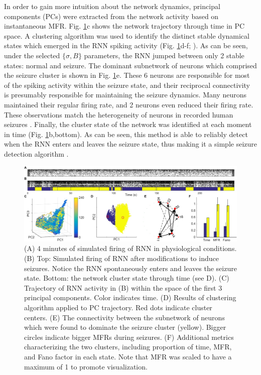 \documentclass[journal,twoside,web]{ieeecolor}
\begin{document}
In order to gain more intuition about the network dynamics, principal components (PCs) were extracted from the network activity based on instantaneous MFR.
Fig. \ref{seizure}c shows the network trajectory through time in PC space.
A clustering algorithm was used to identify the distinct stable dynamical states which emerged in the RNN spiking activity (Fig. \ref{seizure}d-f; \cite{sasaki07,santaniello14}).
As can be seen, under the selected $\{\sigma,B\}$ parameters, the RNN jumped between only 2 stable states: normal and seizure.
The dominant subnetwork of neurons which comprised the seizure cluster is shown in Fig. \ref{seizure}e.
These 6 neurons are responsible for most of the spiking activity within the seizure state, and their reciprocal connectivity is presumably responsible for maintaining the seizure dynamics.
Many neurons maintained their regular firing rate, and 2 neurons even reduced their firing rate.
These observations match the heterogeneity of neurons in recorded human seizures \cite{bower12}.
Finally, the cluster state of the network was identified at each moment in time (Fig. \ref{seizure}b,bottom).
As can be seen, this method is able to reliably detect when the RNN enters and leaves the seizure state, thus  making it a simple seizure detection algorithm \cite{mormann07,cook13,netoff15}.

\begin{figure}[!ht]
\centering
\includegraphics[width=180mm]{seizure}
\caption[Seizure Induction]{
	(A) 4 minutes of simulated firing of RNN in physiological conditions.
	(B) Top: Simulated firing of RNN after modifications to induce seizures. Notice the RNN spontaneously enters and leaves the seizure state.
	    Bottom: the network cluster state through time (see D).
	(C) Trajectory of RNN activity in (B) within the space of the first 3 principal components. Color indicates time.
	(D) Results of clustering algorithm applied to PC trajectory. Red dots indicate cluster centers.
	(E) The connectivity between the subnetwork of neurons which were found to dominate the seizure cluster (yellow). Bigger circles indicate bigger MFRs during seizures.
	(F) Additional metrics characterizing the two clusters, including proportion of time, MFR, and Fano factor in each state. Note that MFR was scaled to have a maximum of 1 to promote visualization.
}
\label{seizure}
\end{figure}
\end{document}
